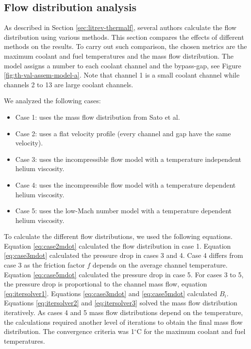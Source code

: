 \subsection{Flow distribution analysis}

As described in Section \ref{sec:litrev-thermalf}, several authors calculate the flow distribution using various methods.
This section compares the effects of different methods on the results.
To carry out such comparison, the chosen metrics are the maximum coolant and fuel temperatures and the mass flow distribution.
The model assigns a number to each coolant channel and the bypass-gap, see Figure \ref{fig:th-val-assem-model-a}.
Note that channel 1 is a small coolant channel while channels 2 to 13 are large coolant channels.

We analyzed the following cases:
\begin{itemize}
    \item Case 1: uses the mass flow distribution from Sato et al.
    \item Case 2: uses a flat velocity profile (every channel and gap have the same velocity).
    \item Case 3: uses the incompressible flow model with a temperature independent helium viscosity.
    \item Case 4: uses the incompressible flow model with a temperature dependent helium viscosity.
    \item Case 5: uses the low-Mach number model with a temperature dependent helium viscosity.
\end{itemize}

To calculate the different flow distributions, we used the following equations.
Equation \ref{eq:case2mdot} calculated the flow distribution in case 1.
Equation \ref{eq:case3mdot} \cite{melese_thermal_1984} calculated the pressure drop in cases 3 and 4.
Case 4 differs from case 3 as the friction factor $f$ depends on the average channel temperature.
Equation \ref{eq:case5mdot} \cite{melese_thermal_1984} calculated the pressure drop in case 5.
For cases 3 to 5, the pressure drop is proportional to the channel mass flow, equation \ref{eq:itersolver1}.
Equations \ref{eq:case3mdot} and \ref{eq:case5mdot} calculated $B_i$.
Equations \ref{eq:itersolver2} and \ref{eq:itersolver3} \cite{melese_thermal_1984} solved the mass flow distribution iteratively.
As cases 4 and 5 mass flow distributions depend on the temperature, the calculations required another level of iterations to obtain the final mass flow distribution.
The convergence criteria was 1$^{\circ}$C for the maximum coolant and fuel temperatures.

